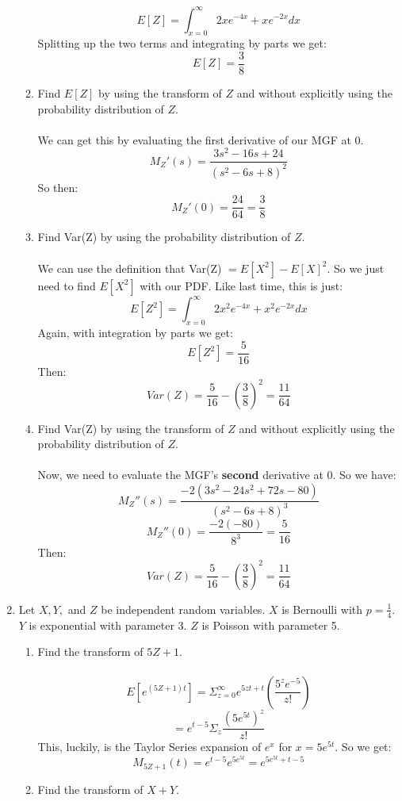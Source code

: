 \begin{enumerate}
\begin{enumerate}
        $$E[Z] = \int_{x=0}^{\infty} 2xe^{-4x} + xe^{-2x} dx$$
        Splitting up the two terms and integrating by parts we get:
        $$E[Z] = \frac{3}{8}$$

      \item Find $E[Z]$ by using the transform of $Z$ and without explicitly using the probability distribution of $Z$.\\\\
        
        We can get this by evaluating the first derivative of our MGF at 0.
        $$M_Z'(s) = \frac{3s^2 - 16s + 24}{(s^2-6s+8)^2}$$
        So then:
        $$M_Z'(0) = \frac{24}{64} = \frac{3}{8}$$

      \item Find Var(Z) by using the probability distribution of $Z$.\\\\

        We can use the definition that Var(Z) $ = E[X^2] - E[X]^2$. So we just need to find $E[X^2]$ with our PDF. Like last time, this is just:
        $$E[Z^2] = \int_{x=0}^{\infty} 2x^2e^{-4x} + x^2e^{-2x} dx$$
        Again, with integration by parts we get:
        $$E[Z^2] = \frac{5}{16}$$
        Then:
        $$Var(Z) = \frac{5}{16} - (\frac{3}{8})^2 = \frac{11}{64}$$

      \item Find Var(Z) by using the transform of $Z$ and without explicitly using the probability distribution of $Z$.\\\\

        Now, we need to evaluate the MGF's \textbf{second} derivative at 0. So we have:
        $$M_Z''(s) = \frac{-2(3s^2 - 24s^2 + 72s - 80)}{(s^2-6s+8)^3}$$
        $$M_Z''(0) = \frac{-2(-80)}{8^3} = \frac{5}{16}$$
        Then:
        $$Var(Z) = \frac{5}{16} - (\frac{3}{8})^2 = \frac{11}{64}$$
    \end{enumerate}
  \item Let $X, Y,$ and $Z$ be independent random variables. $X$ is Bernoulli with $p = \frac{1}{4}$. $Y$ is exponential with parameter 3. $Z$ is Poisson with parameter 5.
    \begin{enumerate}
      \item Find the transform of $5Z + 1$.\\\\

        $$E[e^{(5Z+1)t}] = \Sigma_{z=0}^{\infty} e^{5zt + t} (\frac{5^z e^{-5}}{z!})$$
        $$=e^{t-5} \Sigma_z \frac{(5e^{5t})^z}{z!}$$
        This, luckily, is the Taylor Series expansion of $e^x$ for $x = 5e^{5t}$. So we get:
        $$M_{5Z+1}(t) = e^{t-5}e^{5e^{5t}} = e^{5e^{5t} + t - 5}$$
      \item Find the transform of $X + Y$.\\\\


\end{enumerate}
\end{enumerate}
